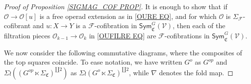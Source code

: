 \documentclass[a4paper,10pt
,draft
]{article}%
\numberwithin{equation}{section}
\numberwithin{figure}{section}
\theoremstyle{definition} %
\newcommand{\Sym}{\ensuremath{\mathsf{Sym}}}%
\newcommand{\F}{\ensuremath{\mathcal F}}
\newcommand{\V}{\ensuremath{\mathcal V}}
\renewcommand{\O}{\ensuremath{\mathcal O}}
\newcommand{\1}{\ensuremath{\mathbbm 1}}%
\begin{document}
\begin{proof}[Proof of Proposition \ref{SIGMAG_COF PROP}]
	It is enough to show that if 
	$\O \to \O[u]$ is a free operad extension as in \eqref{OURE EQ},
	and for which
	$\O$ is $\Sigma_\F$-cofibrant and $u \colon X \to Y$ is a $\F$-cofibration in $\Sym^G_{\mathfrak C}(\V)$,
	then each of the filtration pieces 
	$\O_{k-1} \to \O_k$ in \eqref{OUFILRE EQ}
	are $\F$-cofibrations in $\Sym^G_{\mathfrak C}(\V)$.

We now consider the following commutative diagrams, 
where the composites of the top squares
coincide.
To ease notation, we have written
$G^o$ as $G^{op}$
and 
$\Sigma \wr 
\left((G^{op} \ltimes \Sigma_{\mathfrak{C}})^{\amalg 2}\right)$
as
$\Sigma \wr 
(G^{o} \ltimes \Sigma_{\mathfrak{C}})^{\amalg 2}$, while $\nabla$
denotes the fold map.

\end{proof}
\end{document}
